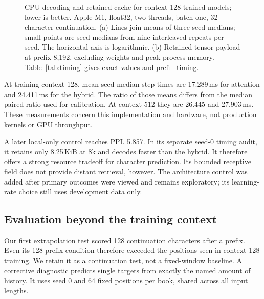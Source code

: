 \documentclass[11pt,letterpaper]{article}
\begin{document}
\begin{figure}[htbp]
{
}
\caption{CPU decoding and retained cache for context-128-trained models; lower is better. Apple M1, float32, two threads, batch one, 32-character continuation. (a) Lines join means of three seed medians; small points are seed medians from nine interleaved repeats per seed. The horizontal axis is logarithmic. (b) Retained tensor payload at prefix 8,192, excluding weights and peak process memory. Table~\ref{tab:timing} gives exact values and prefill timing.}
\label{fig:resources}
\end{figure}

At training context 128, mean seed-median step times are 17.289\,ms for attention and 24.411\,ms for the hybrid. The ratio of those means differs from the median paired ratio used for calibration. At context 512 they are 26.445 and 27.903\,ms. These measurements concern this implementation and hardware, not production kernels or GPU throughput.

A later local-only control reaches PPL 5.857. In its separate seed-0 timing audit, it retains only 8.25\,KiB at 8k and decodes faster than the hybrid. It therefore offers a strong resource tradeoff for character prediction. Its bounded receptive field does not provide distant retrieval, however. The architecture control was added after primary outcomes were viewed and remains exploratory; its learning-rate choice still uses development data only.

\subsection{Evaluation beyond the training context}
Our first extrapolation test scored 128 continuation characters after a prefix. Even its 128-prefix condition therefore exceeded the positions seen in context-128 training. We retain it as a continuation test, not a fixed-window baseline. A corrective diagnostic predicts single targets from exactly the named amount of history. It uses seed 0 and 64 fixed positions per book, shared across all input lengths.
\end{document}

